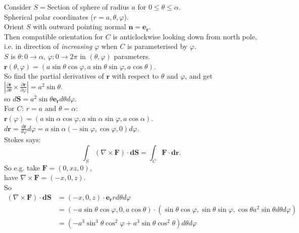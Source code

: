 \documentclass[a4paper]{article}
\begin{document}
\begin{eg}
Consider $S=$Section of sphere of radius $a$ for $0\leq \theta \leq \alpha$.\\
Spherical polar coordinates ($r=a,\theta,\varphi$).\\
Orient $S$ with outward pointing normal $\mathbf{n}=\mathbf{e_{r}}$.\\
Then compatible orientation for $C$ is anticlockwise looking down from north pole, i.e. in direction of \emph{increasing} $\varphi$ when $C$ is parameterised by $\varphi$.\\
$S$ is $\theta : 0\to \alpha$, $\varphi:0\to 2\pi$ in $\left(\theta,\varphi\right)$ parameters.\\
$\mathbf{r}\left(\theta,\varphi\right) = \left(a\sin\theta\cos\varphi,a\sin\theta\sin\varphi,a\cos\theta\right)$.\\
So find the partial derivatives of $\mathbf{r}$ with respect to $\theta$ and $\varphi$, and get
$|\frac{\partial \mathbf{r}}{\partial\theta}\times\frac{\partial\mathbf{r}}{\partial \varphi}|=a^2 \sin\theta$.\\
so $d\mathbf{S}=a^2 \sin\theta \mathbf{e_{r}}d\theta d\varphi$.\\
For $C$: $r=a$ and $\theta=\alpha$:\\
$\mathbf{r}\left(\varphi\right)=\left(a\sin\alpha\cos\varphi,a\sin\alpha\sin\varphi,a\cos\alpha\right)$.\\
$d\mathbf{r}=\frac{d\mathbf{r}}{d\varphi}d\varphi=a\sin\alpha\left(-\sin\varphi,\cos\varphi,0\right)d\varphi$.\\
Stokes says:
\begin{equation*}
\int_{S} \left(\nabla\times\mathbf{F}\right)\cdot \mathbf{dS} = \int_{C}\mathbf{F}\cdot\mathbf{dr}.
\end{equation*}
So e.g. take $\mathbf{F}=\left(0,xz,0\right)$,\\
have $\nabla\times\mathbf{F}=\left(-x,0,z\right)$.\\
So
\begin{equation*}
\begin{aligned}
\left(\nabla\times\mathbf{F}\right)\cdot\mathbf{dS}&=\left(-x,0,z\right)\cdot\mathbf{e_{r}}r d\theta d\varphi\\
&=\left(-a\sin\theta\cos\varphi,0,a\cos\theta\right)\cdot\left(\sin\theta\cos\varphi,\sin\theta\sin\varphi,\cos\theta a^2 \sin\theta d\theta d\varphi\right)\\
&=\left(-a^3 \sin^3 \theta \cos^2 \varphi + a^3 \sin\theta\cos^2 \theta\right) d\theta d\varphi\\

\end{aligned}
\end{equation*}
\end{eg}
\end{document}
